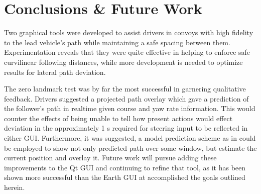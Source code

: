 \documentclass[twocolumn,10pt]{article}
\begin{document}

\section*{Conclusions \& Future Work}

  Two graphical tools were developed to assist drivers in convoys with high fidelity to the lead vehicle’s path while maintaining a safe spacing between them.  Experimentation reveals that they were quite effective in helping to enforce safe curvilinear following distances, while more development is needed to optimize results for lateral path deviation.  

  The zero landmark test was by far the most successful in garnering qualitative feedback.  Drivers suggested a projected path overlay which gave a prediction of the follower’s path in realtime given course and yaw rate information.  This would counter the effects of being unable to tell how present actions would effect deviation in the approximately 1 s required for steering input to be reflected in either GUI.  Furthermore, it was suggested, a model prediction scheme as in \cite{williamthesis} could be employed to show not only predicted path over some window, but estimate the current position and overlay it.  Future work will pursue adding these improvements to the Qt GUI and continuing to refine that tool, as it has been shown more successful than the Earth GUI at accomplished the goals outlined herein.



\nocite{CofieldUGThesis}

\end{document}
